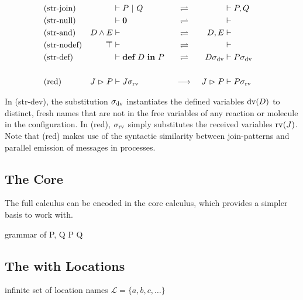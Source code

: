 \begin{align*}
  &(\text{str-join}) & 
    &\vdash P \ |\  Q
   & &\ \ \rightleftharpoons &\ 
    &\vdash P, Q
   & &
  \\
  &(\text{str-null}) & 
    &\vdash \textbf{0}
   & &\ \ \rightleftharpoons &\ 
    &\vdash
   & &
  \\
  &(\text{str-and}) & 
    D \wedge E &\vdash
   & &\ \ \rightleftharpoons &\ 
    D, E &\vdash
   & &
  \\
  &(\text{str-nodef}) & 
    \boldsymbol{\top} &\vdash
   & &\ \ \rightleftharpoons &\ 
    &\vdash
   & &
  \\
  &(\text{str-def}) & 
    &\vdash \textbf{def} \ D \ \textbf{in} \ P
   & &\ \ \rightleftharpoons &\ 
    D\sigma_{\operatorname{dv}} &\vdash P\sigma_{\operatorname{dv}}
   & &
  \\
  \\
  &(\text{red}) & 
    J \vartriangleright P &\vdash J\sigma_{\operatorname{rv}}
   & &\ \longrightarrow &\ 
    J \vartriangleright P &\vdash P\sigma_{\operatorname{rv}}
   & &
\end{align*}

In (str-dev), the substitution $\sigma_{\operatorname{dv}}$ instantiates the defined
variables $\operatorname{dv}(D)$ to distinct, fresh names that are not in the free variables
of any reaction or molecule in the configuration.
In (red), $\sigma_{\operatorname{rv}}$ simply substitutes the received variables $\operatorname{rv}(J)$.
Note that (red) makes use of the syntactic similarity between join-patterns
and parallel emission of messages in processes.


\subsection{The Core \JoinCalc}

The full calculus can be encoded in the core calculus,
which provides a simpler basis to work with.

\begin{JDef}{grammar of \monadicjoincalc}
  P, Q
  \grmr {}
  \altn P \jpar Q
  \altn {}
\end{JDef}


\subsection{The \JoinCalc with Locations}

\cite{fournet_calculus_1996}


infinite set of location names
$ \mathcal{L} = \{ a, b, c, \ldots \} $

